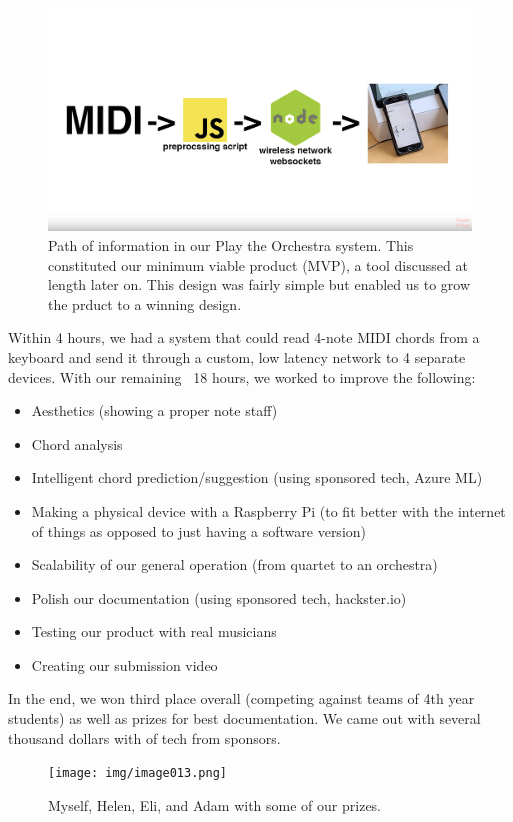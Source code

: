 \documentclass[a4paper,12pt]{article}
\begin{document}
\begin{figure}[H]
\centering
\includegraphics[width=1\textwidth]{img/image012.png}
\caption{Path of information in our Play the Orchestra system. This constituted our minimum viable product (MVP), a tool discussed at length later on. This design was fairly simple but enabled us to grow the prduct to a winning design.}
\label{}
\end{figure}

Within 4 hours, we had a system that could read 4-note MIDI chords from a keyboard and send it through a custom, low latency network to 4 separate devices. With our remaining ~18 hours, we worked to improve the following:

\begin{itemize}
	\item Aesthetics (showing a proper note staff)
	\item Chord analysis
	\item Intelligent chord prediction/suggestion (using sponsored tech, Azure ML)
	\item Making a physical device with a Raspberry Pi (to fit better with the internet of things as opposed to just having a software version)
	\item Scalability of our general operation (from quartet to an orchestra)
	\item Polish our documentation (using sponsored tech, hackster.io)
	\item Testing our product with real musicians
	\item Creating our submission video
\end{itemize}
In the end, we won third place overall (competing against teams of 4th year students) as well as prizes for best documentation. We came out with several thousand dollars with of tech from sponsors.

\begin{figure}[H]
\centering
\texttt{[image: img/image013.png]}
\caption{Myself, Helen, Eli, and Adam with some of our prizes.}
\label{}
\end{figure}
\end{document}
